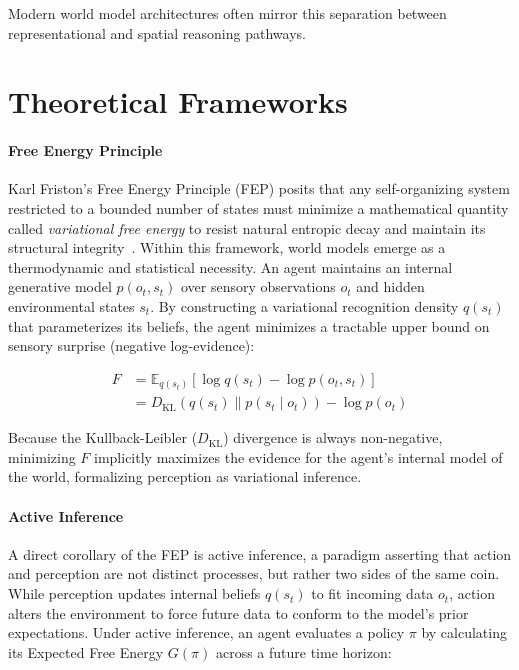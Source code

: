 \documentclass{tufte-handout}
\begin{document}
Modern world model architectures often mirror this separation between representational and
spatial reasoning pathways.

\section{Theoretical Frameworks}

\paragraph{Free Energy Principle}
Karl Friston's Free Energy Principle (FEP) posits that any self-organizing system restricted to a bounded number of 
states must minimize a mathematical quantity called \textit{variational free energy} to resist natural entropic decay and 
maintain its structural integrity~\nocite{friston2010}. 
Within this framework, world models emerge as a thermodynamic and statistical necessity. An agent maintains an internal generative 
model $p(o_t, s_t)$ over sensory observations $o_t$ and hidden environmental states $s_t$. By constructing a variational recognition 
density $q(s_t)$ that parameterizes its beliefs, the agent minimizes a tractable upper bound on sensory surprise (negative log-evidence):

\begin{equation}
    \begin{split}
        F &= \mathbb{E}_{q(s_t)}\left[\log q(s_t) - \log p(o_t, s_t)\right] \\
          &= D_{\mathrm{KL}}\left(q(s_t) \parallel p(s_t \mid o_t)\right) - \log p(o_t)
    \end{split}
    \label{eq:fep}
\end{equation}

Because the Kullback-Leibler ($D_{\mathrm{KL}}$) divergence is always non-negative, minimizing $F$ implicitly maximizes 
the evidence for the agent's internal model of the world, formalizing perception as variational inference.

\paragraph{Active Inference}
A direct corollary of the FEP is active inference, a paradigm asserting that action and perception are not 
distinct processes, but rather two sides of the same coin. While perception updates internal beliefs $q(s_t)$ to fit 
incoming data $o_t$, action alters the environment to force future data to conform to the model's prior expectations. 
Under active inference, an agent evaluates a policy $\pi$ by calculating its Expected Free Energy $G(\pi)$ across a future time horizon:
\end{document}
